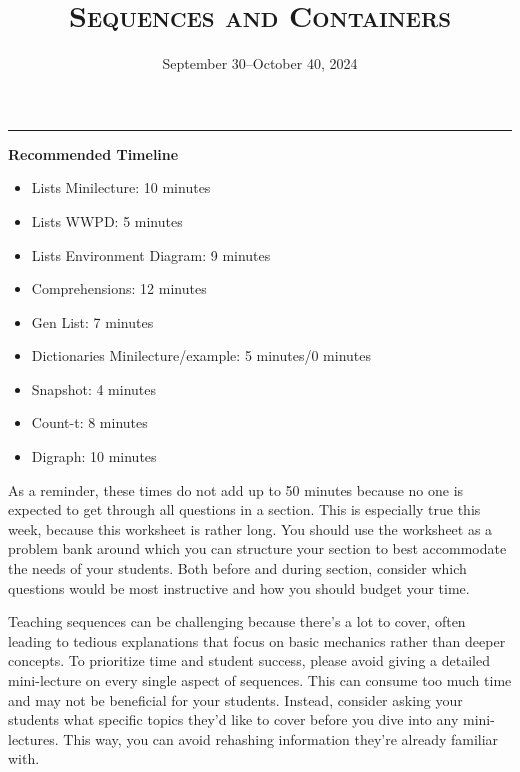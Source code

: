 \documentclass{exam}
\title{\textsc{Sequences and Containers}}
\date{September 30--October 40, 2024}
\begin{document}
\maketitle
\rule{\textwidth}{0.15em}


\begin{meta}
    \textbf{Recommended Timeline}
    \begin{itemize}
        \item Lists Minilecture: 10 minutes
        \item Lists WWPD: 5 minutes
        \item Lists Environment Diagram: 9 minutes
        \item Comprehensions: 12 minutes
        \item Gen List: 7 minutes
        \item Dictionaries Minilecture/example: 5 minutes/0 minutes
        \item Snapshot: 4 minutes
        \item Count-t: 8 minutes
        \item Digraph: 10 minutes
    \end{itemize}

    As a reminder, these times do not add up to 50 minutes because no one is expected 
    to get through all questions in a section. This is especially true this week, 
    because this worksheet is rather long. You should use the worksheet as a problem bank
     around which you can structure your section to best accommodate the needs of your 
     students. Both before and during section, consider which questions would be most 
     instructive and how you should budget your time.

	Teaching sequences can be challenging because there’s a lot to cover, often leading to tedious 	explanations that focus on basic mechanics rather than deeper concepts. To prioritize time and 	student success, please avoid giving a detailed mini-lecture on every single aspect of sequences. 	This can consume too much time and may not be beneficial for your students. Instead, consider 	asking your students what specific topics they’d like to cover before you dive into any mini-lectures. 	This way, you can avoid rehashing information they’re already familiar with.
\end{meta}
\end{document}
